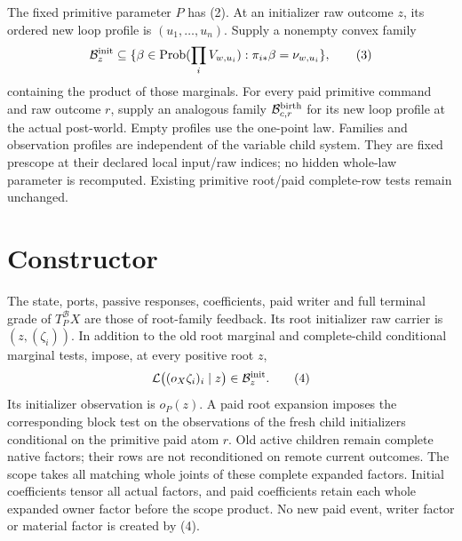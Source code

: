 \documentclass[11pt]{article}
\begin{document}
The fixed primitive parameter $P$ has (2). At an initializer raw outcome $z$, its ordered new loop profile is $(u_1,\ldots,u_n)$. Supply a nonempty convex family
\[
 \mathcal B^{\rm init}_z\subseteq
 \{\beta\in\operatorname{Prob}(\prod_i V_{w,u_i}):
                 \pi_{i*}\beta=\nu_{w,u_i}\},                \tag{3}
\]
containing the product of those marginals. For every paid primitive command and raw outcome $r$, supply an analogous family $\mathcal B^{\rm birth}_{c,r}$ for its new loop profile at the actual post-world. Empty profiles use the one-point law. Families and observation profiles are independent of the variable child system. They are fixed prescope at their declared local input/raw indices; no hidden whole-law parameter is recomputed. Existing primitive root/paid complete-row tests remain unchanged.

\section{Constructor}
The state, ports, passive responses, coefficients, paid writer and full terminal grade of $T_P^{\mathcal B}X$ are those of root-family feedback. Its root initializer raw carrier is $(z,(\zeta_i))$. In addition to the old root marginal and complete-child conditional marginal tests, impose, at every positive root $z$,
\[
 \mathcal L\big((o_X\zeta_i)_i\mid z\big)
                      \in\mathcal B^{\rm init}_z.            \tag{4}
\]
Its initializer observation is $o_P(z)$. A paid root expansion imposes the corresponding block test on the observations of the fresh child initializers conditional on the primitive paid atom $r$. Old active children remain complete native factors; their rows are not reconditioned on remote current outcomes. The scope takes all matching whole joints of these complete expanded factors. Initial coefficients tensor all actual factors, and paid coefficients retain each whole expanded owner factor before the scope product. No new paid event, writer factor or material factor is created by (4).
\end{document}
